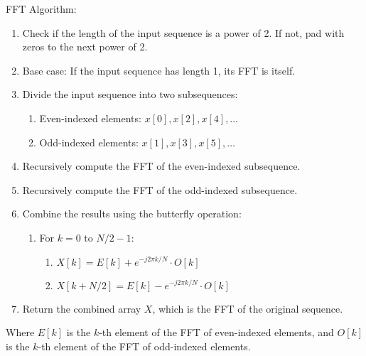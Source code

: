 FFT Algorithm:
\begin{enumerate}
    \item Check if the length of the input sequence is a power of 2. If not, pad with zeros to the next power of 2.
    \item Base case: If the input sequence has length 1, its FFT is itself.
    \item Divide the input sequence into two subsequences:
        \begin{enumerate}
            \item Even-indexed elements: $x[0], x[2], x[4], \ldots$
            \item Odd-indexed elements: $x[1], x[3], x[5], \ldots$
        \end{enumerate}
    \item Recursively compute the FFT of the even-indexed subsequence.
    \item Recursively compute the FFT of the odd-indexed subsequence.
    \item Combine the results using the butterfly operation:
        \begin{enumerate}
            \item For $k = 0$ to $N/2-1$:
                \begin{enumerate}
                    \item $X[k] = E[k] + e^{-j2\pi k/N} \cdot O[k]$
                    \item $X[k+N/2] = E[k] - e^{-j2\pi k/N} \cdot O[k]$
                \end{enumerate}
        \end{enumerate}
    \item Return the combined array $X$, which is the FFT of the original sequence.
\end{enumerate}

Where $E[k]$ is the $k$-th element of the FFT of even-indexed elements, and $O[k]$ is the $k$-th element of the FFT of odd-indexed elements.



